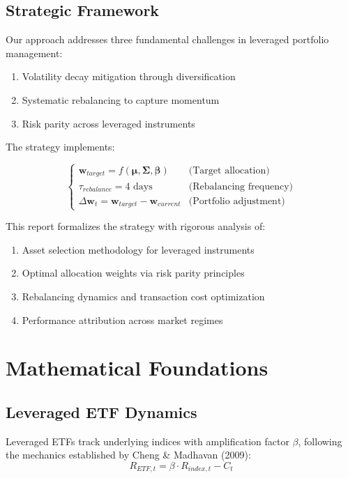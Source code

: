 \documentclass[onecolumn,ieee]{arithmaxresearch}
\begin{document}
\subsection{Strategic Framework}
Our approach addresses three fundamental challenges in leveraged portfolio management:
\begin{enumerate}
    \item Volatility decay mitigation through diversification
    \item Systematic rebalancing to capture momentum
    \item Risk parity across leveraged instruments
\end{enumerate}

The strategy implements:


\begin{equation*}
\begin{cases}
\mathbf{w}_{target} = f(\boldsymbol{\mu}, \boldsymbol{\Sigma}, \boldsymbol{\beta}) & \text{(Target allocation)} \\
\tau_{rebalance} = 4 \text{ days} & \text{(Rebalancing frequency)} \\
\Delta \mathbf{w}_t = \mathbf{w}_{target} - \mathbf{w}_{current} & \text{(Portfolio adjustment)}
\end{cases}
\end{equation*}

This report formalizes the strategy with rigorous analysis of:
\begin{enumerate}
    \item Asset selection methodology for leveraged instruments
    \item Optimal allocation weights via risk parity principles
    \item Rebalancing dynamics and transaction cost optimization
    \item Performance attribution across market regimes
\end{enumerate}

\section{Mathematical Foundations}

\subsection{Leveraged ETF Dynamics}

Leveraged ETFs track underlying indices with amplification factor $\beta$, following the mechanics established by Cheng \& Madhavan (2009):
\begin{equation}
R_{ETF,t} = \beta \cdot R_{index,t} - C_t
\end{equation}
\end{document}
